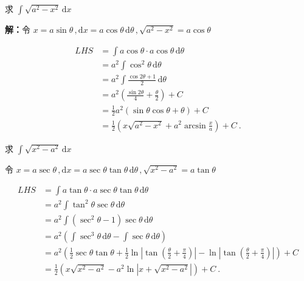 \begin{example}{}
求 $\displaystyle{\int \sqrt{a^2-x^2}\,\mathrm{d}x}$ 

\textbf{解：}令 $\displaystyle{x=a\sin\theta\,,\mathrm{d}x=a\cos\theta\,\mathrm{d}\theta\,,\sqrt{a^2-x^2}=a\cos\theta}$

\begin{equation}
\begin{aligned}
LHS&=\int a\cos\theta\cdot a\cos\theta\,\mathrm{d}\theta\\ &=a^2\int\cos^2\theta\,\mathrm{d}\theta\\ &=a^2\int\frac{\cos2\theta+1}{2}\,\mathrm{d}\theta\\ &=a^2\left(\frac{\sin2\theta}{4}+\frac{\theta}{2}\right)+C\\ &=\frac{1}{2}a^2\left(\sin\theta\cos\theta+\theta\right)+C\\ &=\frac{1}{2}\left(x\sqrt{a^2-x^2}+a^2\arcsin\frac{x}{a}\right)+C~.
\end{aligned}
\end{equation}
\end{example}
\begin{example}{}
求 $\displaystyle{\int \sqrt{x^2-a^2}\,\mathrm{d}x}$

令 $\displaystyle{x=a\sec\theta\,,\mathrm{d}x=a\sec\theta\tan\theta\,\mathrm{d}\theta\,,\sqrt{x^2-a^2}=a\tan\theta}$ 

\begin{equation}
\begin{aligned}
LHS&=\int a\tan\theta\cdot a\sec\theta\tan\theta\,\mathrm{d}\theta\\ &=a^2\int \tan^2\theta \sec\theta\,\mathrm{d}\theta\\ &=a^2\int (\sec^2\theta-1)\sec\theta\,\mathrm{d}\theta\\ &=a^2\left(\int\sec^3\theta\,\mathrm{d}\theta-\int\sec\theta\,\mathrm{d}\theta\right)\\ &=a^2\left(\frac{1}{2}\sec\theta\tan\theta+\frac{1}2\ln\left|\tan\left(\frac{\theta}{2}+\frac{\pi}{4}\right)\right|-\ln\left|\tan\left(\frac{\theta}{2}+\frac{\pi}{4}\right)\right|\right)+C\\ &=\frac{1}{2}\left(x\sqrt{x^2-a^2}-a^2\ln|x+\sqrt{x^2-a^2}|\right)+C~.
\end{aligned}
\end{equation}
\end{example}


